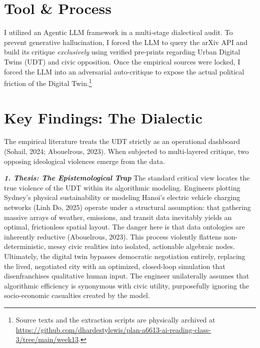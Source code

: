 \documentclass[11pt, twocolumn]{article}
\begin{document}

\section*{Tool \& Process}
I utilized an Agentic LLM framework in a multi-stage dialectical audit. To prevent generative hallucination, I forced the LLM to query the arXiv API and build its critique \textit{exclusively} using verified pre-prints regarding Urban Digital Twins (UDT) and civic opposition. Once the empirical sources were locked, I forced the LLM into an adversarial auto-critique to expose the actual political friction of the Digital Twin.\footnote{Source texts and the extraction scripts are physically archived at \url{https://github.com/dhardestylewis/plan-a6613-ai-reading-class-3/tree/main/week13}.}

\section*{Key Findings: The Dialectic}
\noindent The empirical literature treats the UDT strictly as an operational dashboard (Sohail, 2024; Abouelrous, 2023). When subjected to multi-layered critique, two opposing ideological violences emerge from the data.

\textbf{\textit{1. Thesis: The Epistemological Trap}}
The standard critical view locates the true violence of the UDT within its algorithmic modeling. Engineers plotting Sydney's physical sustainability or modeling Hanoi's electric vehicle charging networks (Linh Do, 2025) operate under a structural assumption: that gathering massive arrays of weather, emissions, and transit data inevitably yields an optimal, frictionless spatial layout. The danger here is that data ontologies are inherently reductive (Abouelrous, 2023). This process violently flattens non-deterministic, messy civic realities into isolated, actionable algebraic nodes. Ultimately, the digital twin bypasses democratic negotiation entirely, replacing the lived, negotiated city with an optimized, closed-loop simulation that disenfranchises qualitative human input. The engineer unilaterally assumes that algorithmic efficiency is synonymous with civic utility, purposefully ignoring the socio-economic casualties created by the model.
\end{document}
